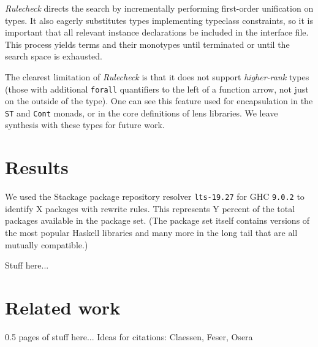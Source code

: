 \documentclass[format=sigconf, nonacm=true, review=true, screen=true]{acmart}
\newcommand{\Rulecheck}{\textit{Rulecheck}\xspace}
\begin{document}
\Rulecheck directs the search by incrementally performing first-order unification on types. It also eagerly substitutes types implementing typeclass constraints, so it is important that all relevant instance declarations be included in the interface file. This process yields terms and their monotypes until terminated or until the search space is exhausted.

The clearest limitation of \Rulecheck is that it does not support \textit{higher-rank} types (those with additional \texttt{forall} quantifiers to the left of a function arrow, not just on the outside of the type). One can see this feature used for encapsulation in the \texttt{ST} and \texttt{Cont} monads, or in the core definitions of lens libraries. We leave synthesis with these types for future work.

\section{Results}

We used the Stackage package repository resolver \texttt{lts-19.27} for GHC \texttt{9.0.2} to identify X packages with rewrite rules. \cite{stackage} This represents Y percent of the total packages available in the package set. (The package set itself contains versions of the most popular Haskell libraries and many more in the long tail that are all mutually compatible.)

Stuff here...

\section{Related work}

0.5 pages of stuff here... Ideas for citations: Claessen, Feser, Osera



\end{document}

